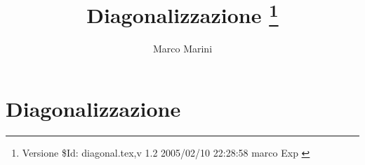 \documentclass{article}
\begin{document}
  \title{Diagonalizzazione \thanks{Versione \$Id: diagonal.tex,v 1.2 2005/02/10 22:28:58 marco Exp $ $}}
  \author{Marco Marini}
  \maketitle
  \part{Diagonalizzazione}
  
  
\end{document}
